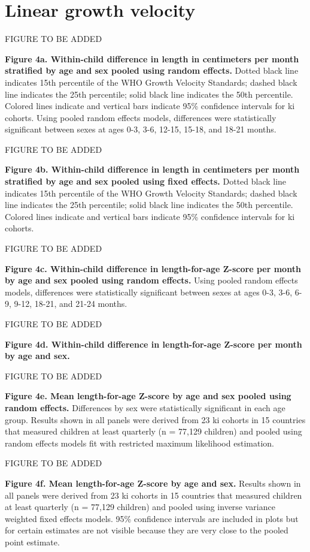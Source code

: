 \documentclass[9pt,]{book}
\begin{document}
\hypertarget{linear-growth-velocity}{%
\section{Linear growth velocity}\label{linear-growth-velocity}}

FIGURE TO BE ADDED

\textbf{Figure 4a. Within-child difference in length in centimeters per month stratified by age and sex pooled using random effects.} Dotted black line indicates 15th percentile of the WHO Growth Velocity Standards; dashed black line indicates the 25th percentile; solid black line indicates the 50th percentile. Colored lines indicate and vertical bars indicate 95\% confidence intervals for ki cohorts. Using pooled random effects models, differences were statistically significant between sexes at ages 0-3, 3-6, 12-15, 15-18, and 18-21 months.

FIGURE TO BE ADDED

\textbf{Figure 4b. Within-child difference in length in centimeters per month stratified by age and sex pooled using fixed effects.} Dotted black line indicates 15th percentile of the WHO Growth Velocity Standards; dashed black line indicates the 25th percentile; solid black line indicates the 50th percentile. Colored lines indicate and vertical bars indicate 95\% confidence intervals for ki cohorts.

FIGURE TO BE ADDED

\textbf{Figure 4c. Within-child difference in length-for-age Z-score per month by age and sex pooled using random effects.} Using pooled random effects models, differences were statistically significant between sexes at ages 0-3, 3-6, 6-9, 9-12, 18-21, and 21-24 months.

FIGURE TO BE ADDED

\textbf{Figure 4d. Within-child difference in length-for-age Z-score per month by age and sex. }

FIGURE TO BE ADDED

\textbf{Figure 4e. Mean length-for-age Z-score by age and sex pooled using random effects.} Differences by sex were statistically significant in each age group. Results shown in all panels were derived from 23 ki cohorts in 15 countries that measured children at least quarterly (n = 77,129 children) and pooled using random effects models fit with restricted maximum likelihood estimation.

FIGURE TO BE ADDED

\textbf{Figure 4f. Mean length-for-age Z-score by age and sex.} Results shown in all panels were derived from 23 ki cohorts in 15 countries that measured children at least quarterly (n = 77,129 children) and pooled using inverse variance weighted fixed effects models. 95\% confidence intervals are included in plots but for certain estimates are not visible because they are very close to the pooled point estimate.
\end{document}
